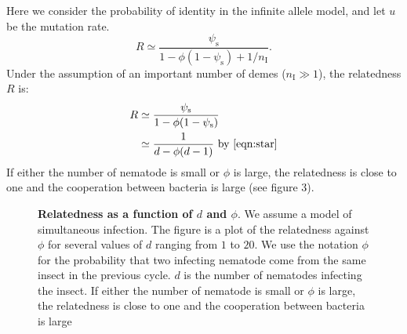 \documentclass[10pt]{article}
\newcommand{\nI}{{n_\textrm{I}}}
\newcommand{\psis}{\psi_\mathrm{s}}
\begin{document}
\begin{multicols}{2}
Here we consider the probability of identity  in the infinite allele model, and let $u$ be the mutation rate.
 \begin{equation}
 R \simeq \dfrac{ \psis  }{ 1 - \phi (1- \psis )+1 / \nI }.  \label{eqn:relatedness_simultaneous}
 \end{equation} 
Under the assumption of an important number of demes ($\nI \gg 1$), the relatedness $R$ is:
 \begin{align}
 R & \simeq \dfrac{ \psis  }{ 1 - \phi (1- \psis ) }  \\
   & \simeq \dfrac{ 1  }{ d - \phi (d- 1 ) } \text{ by } \eqref{eqn:star}
 \end{align}
 If either the number of nematode is small or $\phi$ is large, the relatedness is close to one and the cooperation between bacteria is large (see figure 3). 
 \begin{figure}[H]
\label{fig:R}
\centering
{}
\caption{ \textbf{Relatedness as a function of $d$ and $\phi$}. 
We assume a model of simultaneous infection. 
The figure is a plot of the relatedness against $\phi$ for several values of $d$ ranging from $1$ to $20$. 
We use the notation $\phi$ for the probability that two infecting nematode come from the same insect in the previous cycle. 
$d$ is the number of nematodes infecting the insect. 
If either the number of nematode is small or $\phi$ is large, the relatedness is close to one and the cooperation between bacteria is large}
\end{figure}

\end{multicols}
\end{document}
